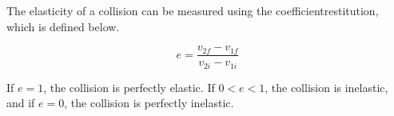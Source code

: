  
The elasticity of a collision can be measured using the \gls{coefficientrestitution}, which is defined below.
	\begin{mdframed}[backgroundcolor=orange!20!white]
	\begin{equation}
		e = \frac{v_{2f}-v_{1f}}{v_{2i}-v_{1i}}
		\label{eqn:coefficientofrestitution}
	\end{equation}
\end{mdframed}

If $e = 1$, the collision is perfectly elastic.  If $0<e<1$, the collision is inelastic, and if $e=0$, the collision is perfectly inelastic.  